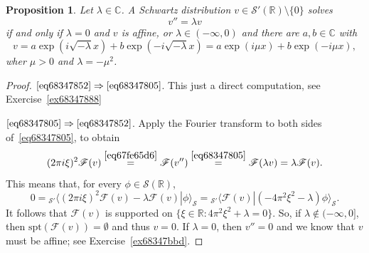 \documentclass[a4paper,9pt]{amsart}
\newcommand{\scr}[1]{\mathscr{#1}}
\newcommand{\R}{\mathbb{R}}	%
\newcommand{\C}{\mathbb{C}}	%
\newcommand{\THEN}{\Rightarrow}	%
\newcommand{\spt}{\mathrm{spt}}
\theoremstyle{plain}
\newtheorem{proposition}{Proposition}[section]
\theoremstyle{definition}
\theoremstyle{remark}
\begin{document}
\begin{proposition}\label{prop6834897a}
	Let $\lambda\in\C$.
	A Schwartz distribution $v\in\scr S'(\R)\setminus\{0\}$ solves 
	\begin{equation}\label{eq68347805}
		v''=\lambda v 
	\end{equation}
	if and only if $\lambda=0$ and $v$ is affine,
	or $\lambda\in(-\infty,0)$ and there are $a,b\in\C$ with
	\begin{equation}\label{eq68347852}
		v = a \exp(i\sqrt{-\lambda} x)  + b \exp(-i\sqrt{-\lambda} x) 
		= a \exp(i\mu x)  + b \exp(-i\mu x) ,
	\end{equation}
	wher $\mu>0$ and $\lambda=-\mu^2$.
\end{proposition}
\begin{proof}
	$\eqref{eq68347852}\THEN\eqref{eq68347805}$.
	This just a direct computation, see Exercise~\ref{ex68347888}

	$\eqref{eq68347805}\THEN\eqref{eq68347852}$.
	Apply the Fourier transform to both sides of~\eqref{eq68347805}, to obtain
	\begin{equation}
		(2\pi i\xi)^2\scr F(v)
		\overset{\eqref{eq67fe65d6}}=\scr F(v'')
		\overset{\eqref{eq68347805}}= \scr F(\lambda v)
		= \lambda \scr F(v) .
	\end{equation}
	This means that, for every $\phi\in\scr S(\R)$,
	\begin{equation}\label{eq68347c6d}
		0 = {}_{\scr S'}\langle (2\pi i\xi)^2\scr F(v) - \lambda \scr F(v) | \phi \rangle_{\scr S}
		= {}_{\scr S'}\langle \scr F(v) | (-4\pi^2 \xi^2 - \lambda)\phi \rangle_{\scr S} .
	\end{equation}
	It follows that $\scr F(v)$ is supported on $\{\xi\in\R: 4\pi^2 \xi^2 + \lambda=0\}$.
	So, if $\lambda\notin(-\infty,0]$, then $\spt(\scr F(v))=\emptyset$ and thus $v=0$.
	If $\lambda=0$, then $v''=0$ and we know that $v$ must be affine; see Exercise~\ref{ex68347bbd}.
	

\end{proof}
\end{document}
